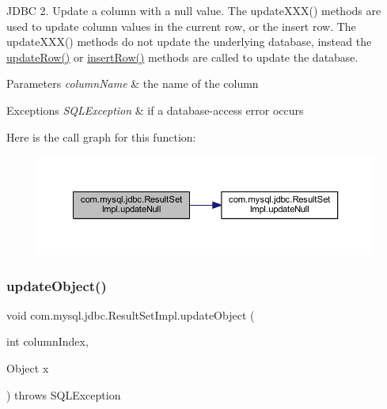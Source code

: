 J\+D\+BC 2. Update a column with a null value. The update\+X\+X\+X() methods are used to update column values in the current row, or the insert row. The update\+X\+X\+X() methods do not update the underlying database, instead the \mbox{\hyperlink{classcom_1_1mysql_1_1jdbc_1_1_result_set_impl_a2842d32292d023aaeeafedeed3322981}{update\+Row()}} or \mbox{\hyperlink{classcom_1_1mysql_1_1jdbc_1_1_result_set_impl_a78e304e3279cbcf60392f18c1385e3bf}{insert\+Row()}} methods are called to update the database.


\begin{DoxyParams}{Parameters}
{\em column\+Name} & the name of the column\\
\hline
\end{DoxyParams}

\begin{DoxyExceptions}{Exceptions}
{\em S\+Q\+L\+Exception} & if a database-\/access error occurs \\
\hline
\end{DoxyExceptions}
Here is the call graph for this function\+:
\nopagebreak
\begin{figure}[H]
\begin{center}
\leavevmode
\includegraphics[width=350pt]{classcom_1_1mysql_1_1jdbc_1_1_result_set_impl_ad2f7b1a741e031324edf8760de259369_cgraph}
\end{center}
\end{figure}
\mbox{\label{classcom_1_1mysql_1_1jdbc_1_1_result_set_impl_a7e7ce7db4f6ce71a461c613244cab080}} 
\subsubsection{\texorpdfstring{update\+Object()}{updateObject()}\hspace{0.1cm}{\footnotesize\ttfamily [1/4]}}
{\footnotesize\ttfamily void com.\+mysql.\+jdbc.\+Result\+Set\+Impl.\+update\+Object (\begin{DoxyParamCaption}\item[{int}]{column\+Index,  }\item[{Object}]{x }\end{DoxyParamCaption}) throws S\+Q\+L\+Exception}

